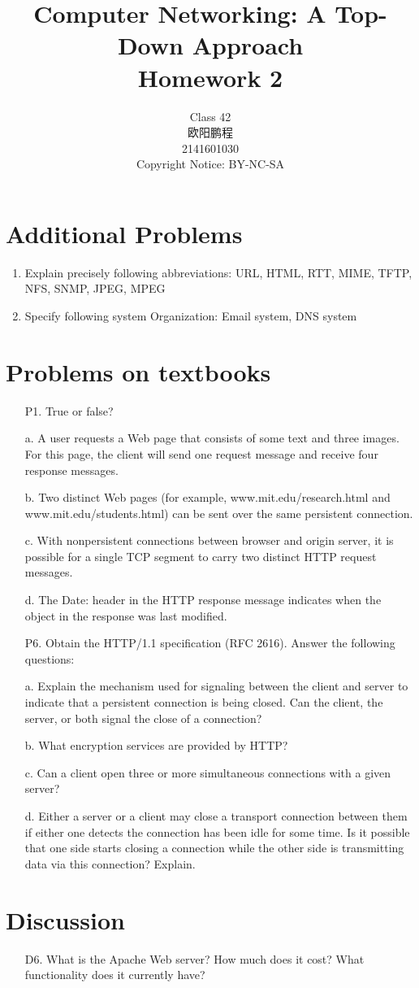 \documentclass[]{article}
\title{Computer Networking: A Top-Down Approach \\ Homework 2}
\author{Class 42 \\ 欧阳鹏程 \\ 2141601030 \\ Copyright Notice: BY-NC-SA}
\begin{document}
\maketitle

\section{Additional Problems}
\begin{enumerate}
	\item Explain precisely following abbreviations:
	\subitem URL, HTML, RTT, MIME, TFTP, NFS, SNMP, JPEG, MPEG
	
	
	\item Specify following system Organization:
	\subitem Email system, DNS system
\end{enumerate}

\section{Problems on textbooks}
\begin{enumerate}
	\item[P1.] True or false?
	
	a. A user requests a Web page that consists of some text and three images.
	For this page, the client will send one request message and receive four
	response messages.
	
	b. Two distinct Web pages (for example, www.mit.edu/research.html
	and www.mit.edu/students.html) can be sent over the same persistent connection.
	
	c. With nonpersistent connections between browser and origin server, it is possible for a single TCP segment to carry two distinct HTTP request messages.
	
	d. The Date: header in the HTTP response message indicates when the	object in the response was last modified.
	
	
	\item[P6.] Obtain the HTTP/1.1 specification (RFC 2616). Answer the following questions:
	
	a. Explain the mechanism used for signaling between the client and server to indicate that a persistent connection is being closed. Can the client, the	server, or both signal the close of a connection?
	
	b. What encryption services are provided by HTTP?
	
	c. Can a client open three or more simultaneous connections with a given	server?
	
	d. Either a server or a client may close a transport connection between them if either one detects the connection has been idle for some time. Is it possible that one side starts closing a connection while the other side is transmitting data via this connection? Explain.
	
\end{enumerate}

\section{Discussion}
\begin{enumerate}
	\item[D6.] What is the Apache Web server? How much does it cost? What functionality does it currently have?
	
\end{enumerate}
\end{document}

